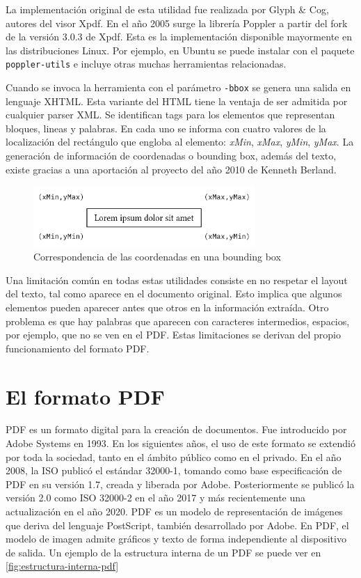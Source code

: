 La implementación original de esta utilidad fue realizada por Glyph \& Cog, autores del visor Xpdf. En el año 2005 surge la librería Poppler a partir del fork de la versión 3.0.3 de Xpdf. Esta es la implementación disponible mayormente en las distribuciones Linux. Por ejemplo, en Ubuntu se puede instalar con el paquete \verb|poppler-utils| e incluye otras muchas herramientas relacionadas.

Cuando se invoca la herramienta con el parámetro \verb|-bbox| se genera una salida en lenguaje XHTML. Esta variante del HTML tiene la ventaja de ser admitida por cualquier parser XML. Se identifican tags para los elementos que representan bloques, lineas y palabras. En cada uno se informa con cuatro valores de la localización del rectángulo que engloba al elemento: \emph{xMin}, \emph{xMax}, \emph{yMin}, \emph{yMax}. La generación de información de coordenadas o bounding box, además del texto, existe gracias a una aportación al proyecto del año 2010 de Kenneth Berland. 

\begin{figure}[hp!]
    \centering
    \includegraphics[width=0.75\textwidth]{imaxes/c-bases-teoricas/correspondencia-coordenadas-bounding.png}
    \caption{Correspondencia de las coordenadas en una bounding box}
    \label{fig:bounding-box}
\end{figure}

Una limitación común en todas estas utilidades consiste en no respetar el layout del texto, tal como aparece en el documento original. Esto implica que algunos elementos pueden aparecer antes que otros en la información extraída. Otro problema es que hay palabras que aparecen con caracteres intermedios, espacios, por ejemplo, que no se ven en el PDF. Estas limitaciones se derivan del propio funcionamiento del formato PDF.

\section{El formato PDF}

PDF es un formato digital para la creación de documentos. Fue introducido por Adobe Systems en 1993. En los siguientes años, el uso de este formato se extendió por toda la sociedad, tanto en el ámbito público como en el privado. En el año 2008, la ISO publicó el estándar 32000-1, tomando como base especificación de PDF en su versión 1.7, creada y liberada por Adobe. Posteriormente se publicó la versión 2.0 como ISO 32000-2 en el año 2017 y más recientemente una actualización en el año 2020. PDF es un modelo de representación de imágenes que deriva del lenguaje PostScript, también desarrollado por Adobe. En PDF, el modelo de imagen admite gráficos y texto de forma independiente al dispositivo de salida. Un ejemplo de la estructura interna de un PDF se puede ver en \ref{fig:estructura-interna-pdf}

